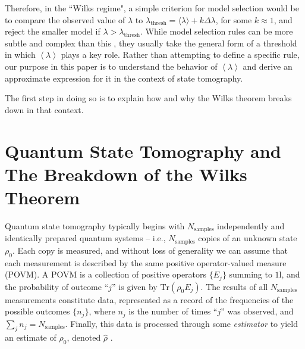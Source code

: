 \documentclass[aps,pra, twocolumn]{revtex4-1}
\newcommand{\Tr}{\mathrm{Tr}}
\newcommand{\Id}{\mathbb{I}}
\newcommand{\expect}[1]{\ensuremath{\left\langle#1\right\rangle}}
\def\Id{1\!\mathrm{l}}
\begin{document}
Therefore, in the ``Wilks regime", a simple criterion for model selection would be to compare the observed value of $\lambda$ to $\lambda_{\mathrm{thresh}} = \langle \lambda \rangle + k\Delta \lambda$, for some $k \approx 1$, and reject the smaller model if $\lambda > \lambda_{\mathrm{thresh}}$.  While model selection rules can be more subtle and complex than this \cite{Akaike1974, Schwarz1978, Kass1995, Spiegelhalter2002}, they usually take the general form of a threshold in which $\expect{\lambda}$ plays a key role.  Rather than attempting to define a specific rule, our purpose in this paper is to understand the behavior of $\expect{\lambda}$ and derive an approximate expression for it in the context of state tomography.

The first step in doing so is to explain how and why the Wilks theorem breaks down in that context.

\section{Quantum State Tomography and The Breakdown of the Wilks Theorem}
\label{sec:qstmodelselection}
Quantum state tomography typically begins with $N_{\mathrm{samples}}$ independently and identically prepared quantum systems -- i.e., $N_{\mathrm{samples}}$ copies of an unknown state $\rho_{0}$.  Each copy is measured, and without loss of generality we can assume that each measurement is described by the same positive operator-valued measure (POVM).  A POVM is a collection of positive operators $\{E_j\}$ summing to $\Id$, and the probability of outcome ``$j$'' is given by $\Tr(\rho_0 E_j)$.  The results of all $N_{\mathrm{samples}}$ measurements constitute data, represented as a record of the frequencies of the possible outcomes $\{n_{j}\}$, where $n_{j}$ is the number of times ``$j$'' was observed, and $\sum_{j}n_{j} = N_{\mathrm{samples}}$.  Finally, this data is processed through some \emph{estimator} to yield an estimate of $\rho_0$, denoted $\hat{\rho}$ . 
\end{document}
